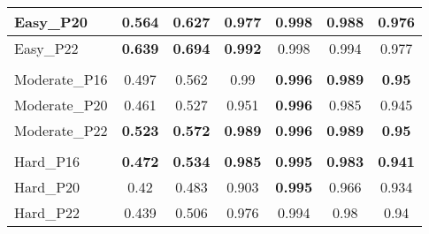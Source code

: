 \begin{table}[]
{\begin{tabular}{|lcccccc|}
			\multicolumn{1}{|l|}{Easy\_P20} & \multicolumn{1}{c|}{0.564} & \multicolumn{1}{c|}{0.627} & \multicolumn{1}{c|}{0.977} & \multicolumn{1}{c|}{0.998} & \multicolumn{1}{c|}{\textbf{0.988}} & 0.976 \\ \hline
			\multicolumn{1}{|l|}{Easy\_P22} & \multicolumn{1}{c|}{\textbf{0.639}} & \multicolumn{1}{c|}{\textbf{0.694}} & \multicolumn{1}{c|}{\textbf{0.992}} & \multicolumn{1}{c|}{0.998} & \multicolumn{1}{c|}{0.994} & 0.977 \\ \hline
			&  &  &  &  &  &  \\ \hline
			\multicolumn{1}{|l|}{Moderate\_P16} & \multicolumn{1}{c|}{0.497} & \multicolumn{1}{c|}{0.562} & \multicolumn{1}{c|}{0.99} & \multicolumn{1}{c|}{\textbf{0.996}} & \multicolumn{1}{c|}{\textbf{0.989}} & \textbf{0.95} \\ \hline
			\multicolumn{1}{|l|}{Moderate\_P20} & \multicolumn{1}{c|}{0.461} & \multicolumn{1}{c|}{0.527} & \multicolumn{1}{c|}{0.951} & \multicolumn{1}{c|}{\textbf{0.996}} & \multicolumn{1}{c|}{0.985} & 0.945 \\ \hline
			\multicolumn{1}{|l|}{Moderate\_P22} & \multicolumn{1}{c|}{\textbf{0.523}} & \multicolumn{1}{c|}{\textbf{0.572}} & \multicolumn{1}{c|}{\textbf{0.989}} & \multicolumn{1}{c|}{\textbf{0.996}} & \multicolumn{1}{c|}{\textbf{0.989}} & \textbf{0.95} \\ \hline
			&  &  &  &  &  &  \\ \hline
			\multicolumn{1}{|l|}{Hard\_P16} & \multicolumn{1}{c|}{\textbf{0.472}} & \multicolumn{1}{c|}{\textbf{0.534}} & \multicolumn{1}{c|}{\textbf{0.985}} & \multicolumn{1}{c|}{\textbf{0.995}} & \multicolumn{1}{c|}{\textbf{0.983}} & \textbf{0.941} \\ \hline
			\multicolumn{1}{|l|}{Hard\_P20} & \multicolumn{1}{c|}{0.42} & \multicolumn{1}{c|}{0.483} & \multicolumn{1}{c|}{0.903} & \multicolumn{1}{c|}{\textbf{0.995}} & \multicolumn{1}{c|}{0.966} & 0.934 \\ \hline
			\multicolumn{1}{|l|}{Hard\_P22} & \multicolumn{1}{c|}{0.439} & \multicolumn{1}{c|}{0.506} & \multicolumn{1}{c|}{0.976} & \multicolumn{1}{c|}{0.994} & \multicolumn{1}{c|}{0.98} & 0.94 \\ \hline			
		\end{tabular}%
	}
\end{table}






